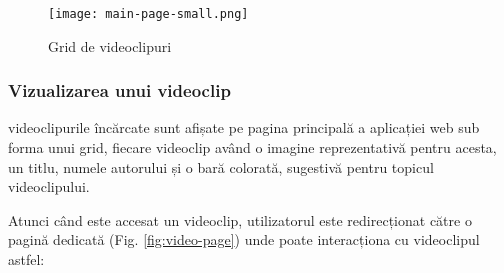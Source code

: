 \begin{figure}[h]
    \centering
    \texttt{[image: main-page-small.png]}
    \caption{Grid de videoclipuri}
    \label{fig:video-grid}
\end{figure}

\subsubsection{Vizualizarea unui videoclip}
videoclipurile încărcate sunt afișate pe pagina principală a aplicației web sub forma
unui grid, fiecare videoclip având o imagine reprezentativă pentru acesta, un titlu,
numele autorului și o bară colorată, sugestivă pentru topicul videoclipului.
\par
Atunci când este accesat un videoclip, utilizatorul este redirecționat către o pagină
dedicată (Fig. \ref{fig:video-page}) unde poate interacționa cu videoclipul astfel:
